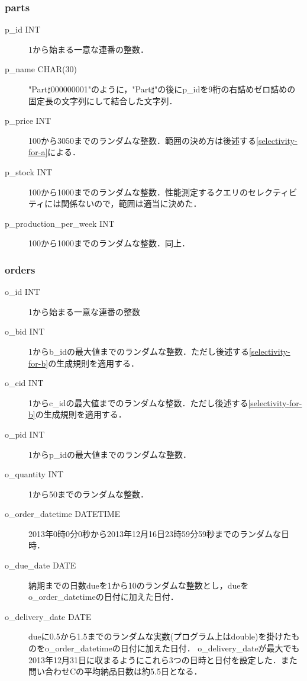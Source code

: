 \documentclass{jsarticle}
\begin{document}
\subsubsection*{parts}
\begin{description}
  \item[p\_id INT] 1から始まる一意な連番の整数．
  \item[p\_name CHAR(30)] "Part$\sharp$000000001"のように，"Part$\sharp$"の後にp\_idを9桁の右詰めゼロ詰めの固定長の文字列にして結合した文字列．
  \item[p\_price INT] 100から3050までのランダムな整数．範囲の決め方は後述する\ref{selectivity-for-a}による．
  \item[p\_stock INT] 100から1000までのランダムな整数．性能測定するクエリのセレクティビティには関係ないので，範囲は適当に決めた．
  \item[p\_production\_per\_week INT] 100から1000までのランダムな整数．同上．
\end{description}

\subsubsection*{orders}
\begin{description}
  \item[o\_id INT] 1から始まる一意な連番の整数
  \item[o\_bid INT] 1からb\_idの最大値までのランダムな整数．ただし後述する\ref{selectivity-for-b}の生成規則を適用する．
  \item[o\_cid INT] 1からc\_idの最大値までのランダムな整数．ただし後述する\ref{selectivity-for-b}の生成規則を適用する．
  \item[o\_pid INT] 1からp\_idの最大値までのランダムな整数．
  \item[o\_quantity INT] 1から50までのランダムな整数．
  \item[o\_order\_datetime DATETIME] 2013年0時0分0秒から2013年12月16日23時59分59秒までのランダムな日時．
  \item[o\_due\_date DATE] 納期までの日数dueを1から10のランダムな整数とし，dueをo\_order\_datetimeの日付に加えた日付．
  \item[o\_delivery\_date DATE] dueに0.5から1.5までのランダムな実数(プログラム上はdouble)を掛けたものをo\_order\_datetimeの日付に加えた日付．
    o\_delivery\_dateが最大でも2013年12月31日に収まるようにこれら3つの日時と日付を設定した．また問い合わせCの平均納品日数は約5.5日となる．
\end{description}
\end{document}

